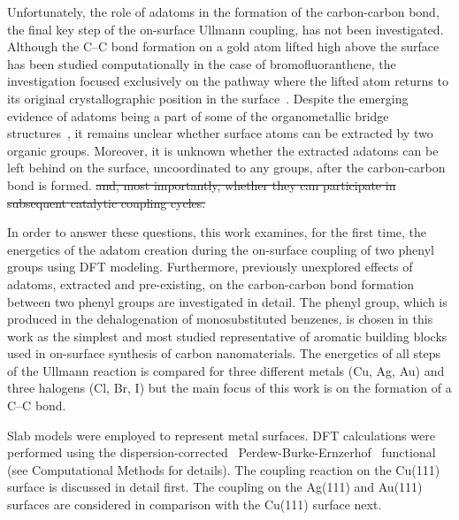 \documentclass[aps,prb,amsmath,amssymb,11pt]{revtex4-1}
\newcommand*{\ACSNANO}{}
\newcommand{\zhzh}{\color{blue}}
\begin{document}
Unfortunately, the role of adatoms in the formation of the carbon-carbon bond, the final key step of the on-surface Ullmann coupling, has not been investigated. Although the C--C bond formation on a gold atom lifted high above the surface has been studied computationally in the case of bromofluoranthene,
the investigation focused exclusively on the pathway where the lifted atom returns to its original crystallographic position in the surface~\cite{jpcc2018}. 
%
Despite the emerging evidence of adatoms being a part of some of the organometallic bridge structures~\cite{acsnano2017, acsnano2019}, it remains unclear whether surface atoms can be extracted by two organic groups. Moreover, it is unknown whether the extracted adatoms can be left behind on the surface, uncoordinated to any groups, after the carbon-carbon bond is formed. \sout{and, most importantly, whether they can participate in subsequent catalytic coupling cycles.}

In order to answer these questions, this work examines, for the first time, the energetics of the adatom creation during the on-surface coupling of two phenyl groups using DFT modeling. 
Furthermore, previously unexplored effects of adatoms, extracted and pre-existing, on the carbon-carbon bond formation between two phenyl groups are investigated in detail. 
The phenyl group, which is produced in the dehalogenation of monosubstituted benzenes, is chosen in this work as the simplest and most studied representative of aromatic building blocks used in on-surface synthesis of carbon nanomaterials. The energetics of all steps of the Ullmann reaction is compared for three different metals (Cu, Ag, Au) and three halogens (Cl, Br, I) {\zhzh but the main focus of this work is on the formation of a C--C bond.} 

\ifdefined\ACSNANO
\else

\fi



\ifdefined\ACSNANO

Slab models were employed to represent metal surfaces. DFT calculations were performed using the dispersion-corrected~\cite{ullmann_136, ullmann_137} Perdew-Burke-Ernzerhof~\cite{ullmann_139} functional (see Computational Methods for details).
%
\fi
%
The coupling reaction on the Cu(111) surface is discussed in detail first. The coupling on the Ag(111) and Au(111) surfaces are considered in comparison with the Cu(111) surface next.
\end{document}
